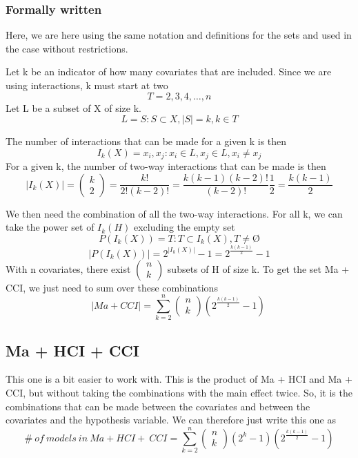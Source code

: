 \subsubsection{Formally written}

Here, we are here using the same notation and definitions for the sets and used in the case without restrictions. 

Let k be an indicator of how many covariates that are included. Since we are using interactions, k must start at two 
\[T=\left.2,3,4,\dots ,n\right.\] 
Let L be a subset of X of size k.
\[L=\left.S:S\subset X,\left|S\right|=k,k\in T\right.\] 


\noindent The number of interactions that can be made for a given k is then
\[I_k\left(X\right)=\left.\left.x_i,x_j\right.:x_i\in L,x_j\in L,x_i\neq x_j\right.\] 
For a given k, the number of two-way interactions that can be made is then
\[\left|I_k\left(X\right)\right|=\left( \begin{array}{c}
k \\ 
2 \end{array}
\right)=\frac{k!}{2!\left(k-2\right)!}=\frac{k\left(k-1\right)\left(k-2\right)!}{\left(k-2\right)!}\frac{1}{2}=\frac{k\left(k-1\right)}{2}\] 

We then need the combination of all the two-way interactions. For all k, we can take the power set of $I_k\left(H\right)$ excluding the empty set
\[P\left(I_k\left(X\right)\right)=\left.T:T\subset I_k\left(X\right),T\neq \textrm{\O}\right.\] 
\[\left|P\left(I_k\left(X\right)\right)\right|=2^{\left|I_k\left(X\right)\right|}-1=2^{\frac{k\left(k-1\right)}{2}}-1\] 
With n covariates, there exist $\left( \begin{array}{c}
n \\ 
k \end{array}
\right)$ subsets of H of size k. To get the set Ma + CCI, we just need to sum over these combinations
\[\left|Ma+CCI\right|=\sum^n_{k=2}{\left( \begin{array}{c}
n \\ 
k \end{array}
\right)}\left(2^{\frac{k\left(k-1\right)}{2}}-1\right)\ \] 

\subsection{Ma + HCI + CCI}
This one is a bit easier to work with. This is the product of Ma + HCI and Ma + CCI, but without taking the combinations with the main effect twice. So, it is the combinations that can be made between the covariates and between the covariates and the hypothesis variable. We can therefore just write this one as 
\[\#\ of\ models\ in\ Ma+HCI+\ CCI=\sum^n_{k=2}{\left( \begin{array}{c}
n \\ 
k \end{array}
\right)\left(2^k-1\right)\left(2^{\frac{k\left(k-1\right)}{2}}-1\right)}\] 
